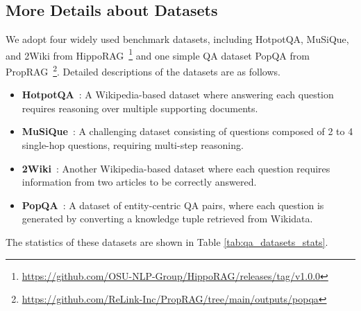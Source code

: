 \subsection{More Details about Datasets}\label{sec:dataset}

We adopt four widely used benchmark datasets, including HotpotQA, MuSiQue, and 2Wiki from HippoRAG~\cite{jimenez2024hipporag}\footnote{\url{https://github.com/OSU-NLP-Group/HippoRAG/releases/tag/v1.0.0}} and one simple QA dataset PopQA from PropRAG~\cite{wang2025proprag}\footnote{\url{https://github.com/ReLink-Inc/PropRAG/tree/main/outputs/popqa}}. Detailed descriptions of the datasets are as follows.
\begin{itemize}[leftmargin=0.5cm]
    \item \textbf{HotpotQA}~\cite{yang2018hotpotqa}: A Wikipedia-based dataset where answering each question requires reasoning over multiple supporting documents.
    \item \textbf{MuSiQue}~\cite{trivedi2021musique}: A challenging dataset consisting of questions composed of 2 to 4 single-hop questions, requiring multi-step reasoning.
    \item \textbf{2Wiki}~\cite{ho2020constructing}: Another Wikipedia-based dataset where each question requires information from two articles to be correctly answered.
    \item \textbf{PopQA}~\cite{mallen2023not}: A dataset of entity-centric QA pairs, where each question is generated by converting a knowledge tuple retrieved from Wikidata.
\end{itemize}
The statistics of these datasets are shown in Table \ref{tab:qa_datasets_stats}. %




